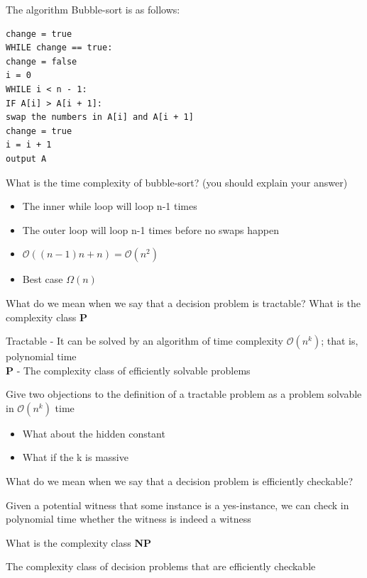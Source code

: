 \documentclass[addpoints]{exam}
\begin{document}
\begin{questions}
\question[5]The algorithm Bubble-sort is as follows:
\begin{lstlisting}
change = true
WHILE change == true:
change = false
i = 0
WHILE i < n - 1:
IF A[i] > A[i + 1]:
swap the numbers in A[i] and A[i + 1]
change = true
i = i + 1
output A
\end{lstlisting}
What is the time complexity of bubble-sort? (you should explain your answer)
\begin{solution}[2in]
	\begin{itemize}
		\item The inner while loop will loop n-1 times
		\item The outer loop will loop n-1 times before no swaps happen
		\item $\mathcal{O}((n-1)n+n)=\mathcal{O}(n^2)$
		\item Best case $\Omega(n)$
	\end{itemize}
\end{solution}
\question[4]What do we mean when we say that a decision problem is tractable? What is the complexity class \textbf{P}
\begin{solution}[2in]
	Tractable - It can be solved by an algorithm of time complexity $\mathcal{O}(n^k)$; that is, polynomial time\\
	\textbf{P} - The complexity class of efficiently solvable problems 
\end{solution}

\question[4]Give two objections to the definition of a tractable problem as a problem solvable in $\mathcal{O}(n^k)$ time
\begin{solution}[2in]
	\begin{itemize}
		\item What about the hidden constant
		\item What if the k is massive
	\end{itemize}
\end{solution}

\question[3]What do we mean when we say that a decision problem is efficiently checkable?
\begin{solution}[2in]
	Given a potential witness that some instance is a yes-instance, we can check in polynomial time whether the witness is indeed a witness
\end{solution}
\question[2]What is the complexity class \textbf{NP}
\begin{solution}[2in]
	The complexity class of decision problems that are efficiently checkable
\end{solution}


\end{questions}
\end{document}
